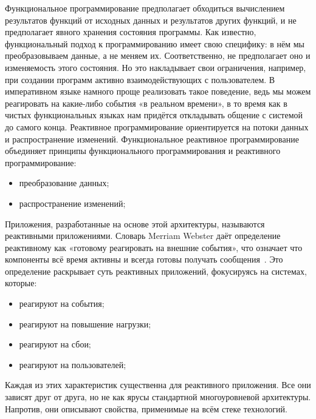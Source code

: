 Функциональное программирование предполагает обходиться вычислением результатов функций от исходных данных и результатов других функций, и не предполагает явного хранения состояния программы. Как известно, функциональный подход к программированию имеет свою специфику: в нём мы преобразовываем данные, а не меняем их. Соответственно, не предполагает оно и изменяемость этого состояния. Но это накладывает свои ограничения, например, при создании программ активно взаимодействующих с пользователем. В императивном языке намного проще реализовать такое поведение, ведь мы можем реагировать на какие-либо события «в реальном времени», в то время как в чистых функциональных языках нам придётся откладывать общение с системой до самого конца. Реактивное программирование ориентируется на потоки данных и распространение изменений. Функциональное реактивное программирование объединяет принципы функционального программирования и реактивного программирование:

\begin{itemize}
  \item преобразование данных;
  \item распространение изменений;
\end{itemize}

Приложения, разработанные на основе этой архитектуры, называются реактивными приложениями. Словарь Merriam Webster даёт определение реактивному как «готовому реагировать на внешние события», что означает что компоненты всё время активны и всегда готовы получать сообщения~\cite{merriam_webster}. Это определение раскрывает суть реактивных приложений, фокусируясь на системах, которые:

\begin{itemize}
  \item реагируют на события;
  \item реагируют на повышение нагрузки;
  \item реагируют на сбои;
  \item реагируют на пользователей;
\end{itemize}

Каждая из этих характеристик существенна для реактивного приложения. Все они зависят друг от друга, но не как ярусы стандартной многоуровневой архитектуры. Напротив, они описывают свойства, применимые на всём стеке технологий.
